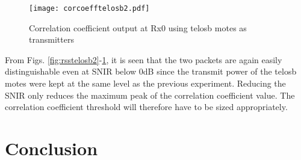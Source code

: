 \documentclass[journal]{IEEEtran}
\begin{document}
\begin{figure}[htb]
\begin{center}
	\texttt{[image: corcoefftelosb2.pdf]} 
\caption{Correlation coefficient output at Rx0 using telosb motes as transmitters}
\label{fig:corcoefftelosb2}
\end{center}
\end{figure}

From Figs. \ref{fig:rsstelosb2}-\ref{fig:corcoefftelosb2}, it is seen that the two packets are again easily distinguishable even at SNIR below 0dB since the transmit power of the telosb motes were kept at the same level as the previous experiment. Reducing the SNIR only reduces the maximum peak of the correlation coefficient value. The correlation coefficient threshold will therefore have to be sized appropriately.

\section{Conclusion} \label{sec:conc}




\end{document}
